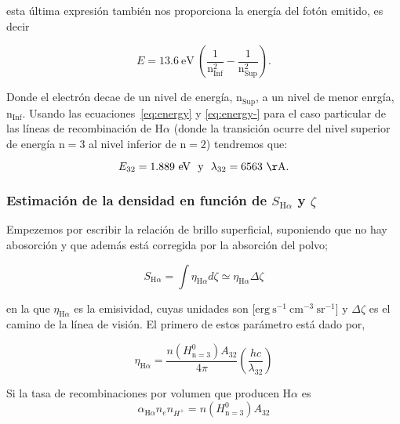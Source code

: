 \documentclass{article}
\newcommand\ha{\ensuremath{\mathrm{H}\alpha}}
\newcommand\A{\ensuremath{\mathrm{\AA{}}}}
\begin{document}
esta última expresión también nos proporciona la energía del fotón emitido, es decir

\begin{equation}
  \label{eq:energy-}
 E = 13.6~\text{eV}~\left(\frac{1}{\text{n}_{\text{Inf}}^{2}}-\frac{1}{\text{n}_{\text{Sup}}^{2}}\right).
\end{equation}

 Donde el electrón decae de un nivel de energía, \(\text{n}_{\text{Sup}}\), a un nivel de menor enrgía, \(\text{n}_{\text{Inf}}\). Usando las ecuaciones~\ref{eq:energy} y \ref{eq:energy-} para el caso particular de las líneas de recombinación de \ha{} (donde la transición ocurre del nivel superior de energía \(\text{n}=3\) al nivel inferior de \(\text{n}=2\)) tendremos que: 

\begin{equation}
 \label{eq:values-energy-landa}
  E_{32} = 1.889~\text{eV}  ~~ \text{y} ~~
  \lambda_{32} = 6563~\A{}.
 \end{equation}

\subsubsection{Estimación de la densidad en función de \(S_{\ha{}}\) y \(\zeta\) }
\label{sec:brillo}

Empezemos por escribir la relación de brillo superficial, suponiendo que no hay abosorción y que además está corregida por la absorción del polvo;

\begin{equation}
  \label{eq:brillo}
  S_{\ha{}} = \int \eta_{\ha{}} d\zeta \simeq \eta_{\ha{}} \Delta \zeta
\end{equation}  

\noindent en la que  \(\eta_{\ha{}}\) es la emisividad, cuyas unidades son [\(\mathrm{erg~s^{-1}~cm^{-3}~sr^{-1}}\)] y \(\Delta \zeta\) es el camino de la línea de visión. El primero de estos parámetro está dado por,

  \begin{equation}
    \label{eq:emision-coeficiente}
    \eta_{\ha} = \frac{n(H^0_{\text{n}=3})A_{32}}{4 \pi} \left(\frac{hc}{\lambda_{32}}\right) 
  \end{equation}

 Si la tasa de recombinaciones por volumen que producen \ha{}  es 
\begin{equation}
  \label{eq:recombinaciones}
  \alpha_{\ha} n_{e}n_{H^{+}}=n(H^0_{\text{n}=3})A_{32}
\end{equation}
\end{document}
